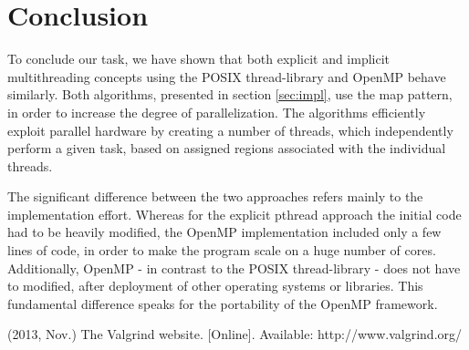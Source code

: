 \documentclass[conference]{IEEEtran}
\begin{document}
\section{Conclusion} 
\label{sec:conclusion}

To conclude our task, we have shown that both explicit and implicit multithreading concepts using the POSIX thread-library and OpenMP behave similarly. Both algorithms, presented in section \ref{sec:impl}, use the map pattern, in order to increase the degree of parallelization. The algorithms efficiently exploit parallel hardware by creating a number of threads, which independently perform a given task, based on assigned regions associated with the individual threads. 

The significant difference between the two approaches refers mainly to the implementation effort. Whereas for the explicit pthread approach the initial code had to be heavily modified, the OpenMP implementation included only a few lines of code, in order to make the program scale on a huge number of cores. Additionally, OpenMP - in contrast to the POSIX thread-library - does not have to modified, after deployment of other operating systems or libraries. This fundamental difference speaks for the portability of the OpenMP framework. 




% 
% 







%
%
%


\begin{thebibliography}{1}
% 
(2013, Nov.) The Valgrind website. [Online]. Available: http://www.valgrind.org/
% 
\end{thebibliography}




\end{document}
